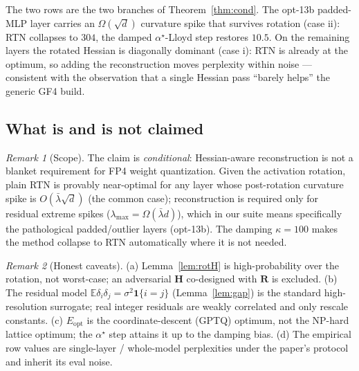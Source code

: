 \documentclass[11pt]{article}
\theoremstyle{remark}
\newtheorem{remark}{Remark}
\newcommand{\E}{\mathbb{E}}
\newcommand{\Hm}{\bm H}
\begin{document}
The two rows are the two branches of Theorem~\ref{thm:cond}. The opt-13b
padded-MLP layer carries an $\Omega(\sqrt d)$ curvature spike that survives
rotation (case ii): RTN collapses to $304$, the damped $\alpha^\star$-Lloyd step
restores $10.5$. On the remaining layers the rotated Hessian is diagonally
dominant (case i): RTN is already at the optimum, so adding the reconstruction
moves perplexity within noise --- consistent with the observation that a single
Hessian pass ``barely helps'' the generic GF4 build.

\subsection{What is and is not claimed}

\begin{remark}[Scope]
The claim is \emph{conditional}: Hessian-aware reconstruction is not a blanket
requirement for FP4 weight quantization. Given the activation rotation, plain
RTN is provably near-optimal for any layer whose post-rotation curvature spike
is $O(\bar\lambda\sqrt d)$ (the common case); reconstruction is required only for
residual extreme spikes ($\lambda_{\max}=\Omega(\bar\lambda d)$), which in our
suite means specifically the pathological padded/outlier layers (opt-13b). The
damping $\kappa=100$ makes the method collapse to RTN automatically where it is
not needed.
\end{remark}

\begin{remark}[Honest caveats]
(a) Lemma~\ref{lem:rotH} is high-probability over the rotation, not worst-case;
an adversarial $\Hm$ co-designed with $\bm R$ is excluded. (b) The residual model
$\E\delta_i\delta_j=\sigma^2\mathbf 1\{i{=}j\}$ (Lemma~\ref{lem:gap}) is the
standard high-resolution surrogate; real integer residuals are weakly correlated
and only rescale constants. (c) $E_{\mathrm{opt}}$ is the coordinate-descent
(GPTQ) optimum, not the NP-hard lattice optimum; the $\alpha^\star$ step attains
it up to the damping bias. (d) The empirical row values are single-layer /
whole-model perplexities under the paper's protocol and inherit its eval noise.
\end{remark}
\end{document}
